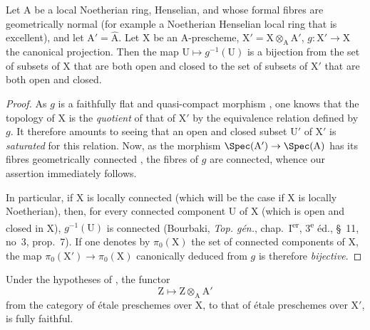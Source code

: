 \begin{corollary}[18.9.4]
\label{IV.18.9.4}
Let $\mathrm{A}$ be a local Noetherian ring, Henselian, and whose formal fibres are geometrically normal (for example a Noetherian Henselian local ring that is excellent), and let $\mathrm{A}'=\hat{\mathrm{A}}$.
Let $\mathrm{X}$ be an A-prescheme, $\mathrm{X}'=\mathrm{X}\otimes_{\mathrm{A}}\mathrm{A}'$, $g:\mathrm{X}'\to\mathrm{X}$ the canonical projection.
Then the map $\mathrm{U}\mapsto g^{-1}(\mathrm{U})$ is a bijection from the set of subsets of $\mathrm{X}$ that are both open and closed to the set of subsets of $\mathrm{X}'$ that are both open and closed.
\end{corollary}

\begin{proof}
As $g$ is a faithfully flat and quasi-compact morphism , one knows that the topology of X is the \emph{quotient} of that of $\mathrm{X}'$ by the equivalence relation defined by $g$.
It therefore amounts to seeing that an open and closed subset $\mathrm{U}'$ of $\mathrm{X}'$ is \emph{saturated} for this relation.
Now, as the morphism $\Spec(\mathrm{A}')\to\Spec(\mathrm{A})$ has its fibres geometrically connected , the fibres of $g$ are connected, whence our assertion immediately follows.

In particular, if X is locally connected (which will be the case if X is locally Noetherian), then, for every connected component U of X (which is open and closed
in X), $g^{-1}(\mathrm{U})$ is connected (Bourbaki, \emph{Top. g\'{e}n.}, chap.~I\textsuperscript{er}, 3\textsuperscript{e} \'{e}d., \S~11, no~3, prop.~7).
If one denotes by $\pi_0(\mathrm{X})$ the set of connected components of X, the map $\pi_0(\mathrm{X}')\to\pi_0(\mathrm{X})$ canonically deduced from $g$ is therefore \emph{bijective}.
\end{proof}

\begin{corollary}[18.9.5]
\label{IV.18.9.5}
Under the hypotheses of , the functor
\begin{equation}
  \mathrm{Z}\mapsto\mathrm{Z}\otimes_{\mathrm{A}}\mathrm{A}'
  \tag{18.9.5.1}
\label{IV.18.9.5.1}
\end{equation}
from the category of \'{e}tale preschemes over $\mathrm{X}$, to that of \'{e}tale preschemes over $\mathrm{X}'$, is fully faithful.
\end{corollary}

